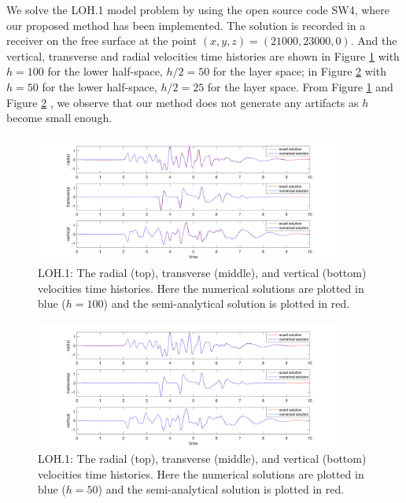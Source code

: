 We solve the LOH.1 model problem by using the open source code SW4, where our proposed method has been implemented. The solution is recorded in a receiver on the free surface at the point $(x, y, z) = (21000, 23000, 0)$. And the vertical, transverse and radial velocities time histories are shown in Figure \ref{loh1_100} with $h = 100$ for the lower half-space, $h/2 = 50$ for the layer space; in Figure \ref{loh1_50} with $h = 50$ for the lower half-space, $h/2 = 25$ for the layer space. From Figure \ref{loh1_100} and Figure \ref{loh1_50} , we observe that our method does not generate any artifacts as $h$ become small enough.
\begin{figure}[htbp]
	\centering
	\includegraphics[width=0.9\textwidth,trim={2cm 0cm 2cm 0cm}, clip]{loh1_h100.png}
	\caption{LOH.1: The radial (top), transverse (middle), and vertical (bottom) velocities time histories. Here the numerical solutions are plotted in blue ($h = 100$) and the semi-analytical solution is plotted in red.}\label{loh1_100}
\end{figure}

\begin{figure}[htbp]
	\centering
	\includegraphics[width=0.9\textwidth,trim={2cm 0cm 2cm 0cm}, clip]{loh1_h50.png}
	\caption{LOH.1: The radial (top), transverse (middle), and vertical (bottom) velocities time histories. Here the numerical solutions are plotted in blue ($h = 50$) and the semi-analytical solution is plotted in red.}\label{loh1_50}
\end{figure}

